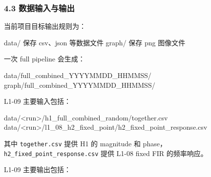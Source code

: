 \documentclass[
]{ctexart}
\newenvironment{Shaded}{}{}
\newcommand{\NormalTok}[1]{#1}
\begin{document}
\subsubsection{4.3
数据输入与输出}\label{ux6570ux636eux8f93ux5165ux4e0eux8f93ux51fa}

当前项目目标输出规则为：

\begin{Shaded}
\begin{Highlighting}[]
\NormalTok{data/   保存 csv、json 等数据文件}
\NormalTok{graph/  保存 png 图像文件}
\end{Highlighting}
\end{Shaded}

一次 full pipeline 会生成：

\begin{Shaded}
\begin{Highlighting}[]
\NormalTok{data/full\_combined\_YYYYMMDD\_HHMMSS/}
\NormalTok{graph/full\_combined\_YYYYMMDD\_HHMMSS/}
\end{Highlighting}
\end{Shaded}

L1-09 主要输入包括：

\begin{Shaded}
\begin{Highlighting}[]
\NormalTok{data/\textless{}run\textgreater{}/h1\_full\_combined\_random/together.csv}
\NormalTok{data/\textless{}run\textgreater{}/l1\_08\_h2\_fixed\_point/h2\_fixed\_point\_response.csv}
\end{Highlighting}
\end{Shaded}

其中 \texttt{together.csv} 提供 H1 的 magnitude 和
phase，\texttt{h2\_fixed\_point\_response.csv} 提供 L1-08 fixed FIR
的频率响应。

L1-09 主要输出包括：
\end{document}

